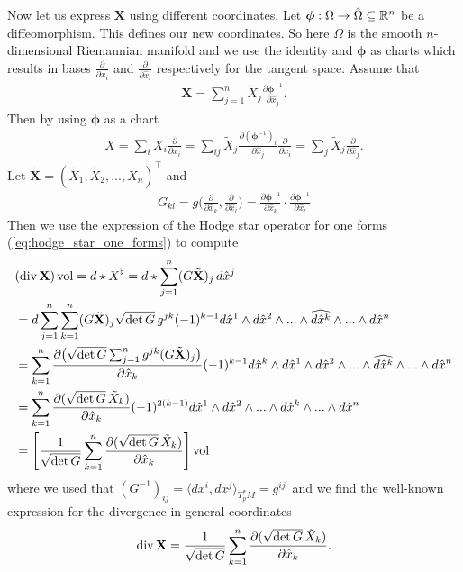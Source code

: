 \documentclass[../master_thesis.tex]{subfiles}
\begin{document}
Now let us express $\mathbf{X}$ using different coordinates. 
Let $\bm{\phi}: \Omega \rightarrow \hat{\Omega} \subseteq \mathbb{R}^n$ be a diffeomorphism. 
This defines our new coordinates. So here $\Omega$ is the smooth $n$-dimensional Riemannian 
manifold and we use the identity and $\bm{\phi}$ as charts which results in 
bases $\frac{\partial }{\partial x_i}$ and $\frac{\partial }{\partial \hat{x}_i}$
respectively for the tangent space.
Assume that 
\begin{align*}
    \mathbf{X} = \sum_{j=1}^n \tilde{X}_j 
    \frac{\partial \bm{\phi}^{-1}}{\partial \hat{x}_j}.
\end{align*}
Then by using $\bm{\phi}$ as a chart
\begin{align*}
    X = \sum_i X_i \frac{\partial}{\partial x_i}
        = \sum_{ij} \tilde{X}_j \frac{\partial (\bm{\phi}^{-1})_i}{\partial \hat{x}_j} \frac{\partial}{\partial x_i}
        = \sum_{j} \tilde{X}_j \frac{\partial}{\partial \hat{x}_j}.
\end{align*}
Let $\tilde{\mathbf{X}} = (\tilde{X}_1, \tilde{X}_2, ..., \tilde{X}_n)^\top$ 
and 
\begin{align*}
    G_{kl} = g\Big(\frac{\partial}{\partial \hat{x}_k}, \frac{\partial}{\partial \hat{x}_l}\Big)
        = \frac{\partial \bm{\phi}^{-1}}{\partial \hat{x}_k} \cdot 
            \frac{\partial \bm{\phi}^{-1}}{\partial \hat{x}_l}
\end{align*}
Then we use the expression of the Hodge star operator 
for one forms (\ref{eq:hodge_star_one_forms}) to compute
\begin{align*}
    &(\operatorname{div} \mathbf{X}) \operatorname{vol} 
    = d \star X^\flat 
    = d \star \sum_{j=1}^n (G \tilde{\mathbf{X}})_j \,d\hat{x}^j 
    \\ &= d \sum_{j=1}^n \sum_{k=1}^n (G \tilde{\mathbf{X}})_j 
        \sqrt{ \det G}\, g^{jk} (-1)^{k-1} d\hat{x}^1 \wedge d\hat{x}^2 \wedge ... \wedge 
        \widehat{d\hat{x}^k} \wedge ... \wedge d\hat{x}^n 
    \\ &= \sum_{k=1}^n \frac{\partial
        \big(\sqrt{ \det G} \sum_{j=1}^n g^{jk} (G \tilde{\mathbf{X}})_j \big)}
        {\partial \hat{x}_k} (-1)^{k-1} d\hat{x}^k \wedge d\hat{x}^1 \wedge d\hat{x}^2 \wedge ... \wedge 
        \widehat{d\hat{x}^k} \wedge ... \wedge d\hat{x}^n 
    \\ &= \sum_{k=1}^n \frac{\partial (\sqrt{ \det G}\,  \tilde{X}_k) }
        {\partial \hat{x}_k} (-1)^{2(k-1)} d\hat{x}^1 \wedge d\hat{x}^2 \wedge ... \wedge 
        d\hat{x}^k \wedge ... \wedge d\hat{x}^n
    \\ &= \left[ \frac{1}{\sqrt{ \det G}} \sum_{k=1}^n 
        \frac{\partial (\sqrt{ \det G}\,  \tilde{X}_k) }{\partial \hat{x}_k}
        \right] \operatorname{vol}
\end{align*}
where we used that $(G^{-1})_{ij} = \langle dx^i, dx^j \rangle_{T^*_p M} = g^{ij}$\
and we find the well-known expression for the divergence in general coordinates
\begin{align*}
    \operatorname{div} \mathbf{X} = \frac{1}{\sqrt{ \det G}} \sum_{k=1}^n 
        \frac{\partial (\sqrt{ \det G} \, \tilde{X}_k )}{\partial \hat{x}_k}.
\end{align*}
\end{document}
